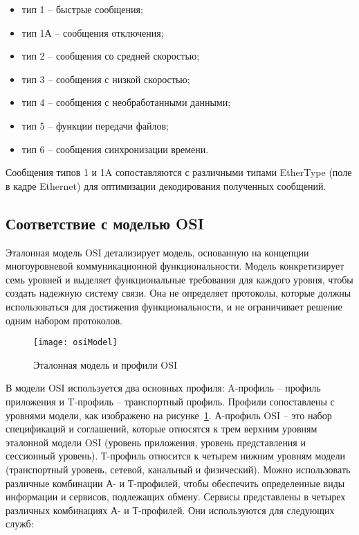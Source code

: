 \begin{itemize}
    \item тип 1 -- быстрые сообщения;
    \item тип 1А -- сообщения отключения;
    \item тип 2 -- сообщения со средней скоростью;
    \item тип 3 -- сообщения с низкой скоростью;
    \item тип 4 -- сообщения с необработанными данными;
    \item тип 5 -- функции передачи файлов;
    \item тип 6 -- сообщения синхронизации времени.
\end{itemize}


Сообщения типов 1 и 1A сопоставляются с различными типами EtherType
(поле в кадре Ethernet) для оптимизации декодирования полученных сообщений.

\subsection{Соответствие с моделью OSI}


Эталонная модель OSI детализирует модель, основанную на концепции многоуровневой
коммуникационной функциональности. Модель конкретизирует семь уровней и выделяет
функциональные требования для каждого уровня, чтобы создать надежную систему связи.
Она не определяет протоколы, которые должны использоваться для достижения
функциональности, и не ограничивает решение одним набором протоколов.

\begin{figure}[ht]
    \centering
    \texttt{[image: osiModel]}
    \caption{Эталонная модель и профили OSI}
    \label{pic::domain::osi_model}
\end{figure}

В модели OSI используется два основных профиля: A-профиль -- профиль приложения
и T-профиль -- транспортный профиль. Профили сопоставлены с уровнями модели,
как изображено на рисунке~\ref{pic::domain::osi_model}. А-профиль OSI --
это набор спецификаций и соглашений, которые относятся к трем верхним уровням
эталонной модели OSI (уровень приложения, уровень представления и сессионный
уровень). Т-профиль относится к четырем нижним уровням модели
(транспортный уровень, сетевой, канальный и физический). Можно использовать
различные комбинации А- и Т-профилей, чтобы обеспечить определенные виды информации
и сервисов, подлежащих обмену. Сервисы представлены в четырех различных комбинациях
А- и Т-профилей. Они используются для следующих служб:

